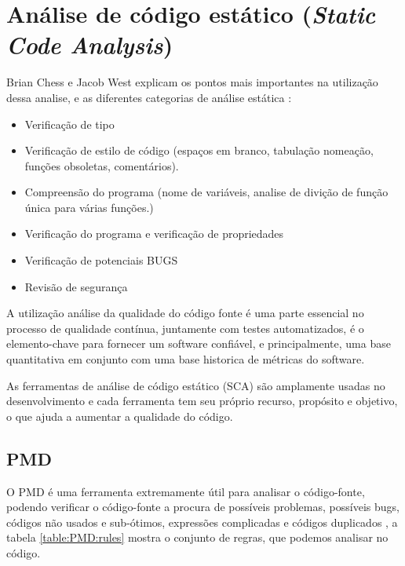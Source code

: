 \documentclass[12pt]{article}
\begin{document}
\section{Análise de código estático (\textit{Static Code Analysis})} \label{sec:staticcodeanalysis}
Brian Chess e Jacob West explicam \cite{SECURE_PROGRAMMING_STATIC_ANALYSIS} os pontos mais importantes na utilização dessa analise, e as diferentes categorias de análise estática :

\begin{itemize}
 \item Verificação de tipo
 \item Verificação de estilo de código (espaços em branco, tabulação nomeação, funções obsoletas, comentários).
 \item Compreensão do programa (nome de variáveis, analise de divição de função única para várias funções.)
 \item Verificação do programa e verificação de propriedades
 \item Verificação de potenciais BUGS
 \item Revisão de segurança
\end{itemize} 

A utilização análise da qualidade do código fonte é uma parte essencial no processo de qualidade contínua, juntamente com testes automatizados, é o elemento-chave para fornecer um software confiável, e principalmente, uma base quantitativa em conjunto com uma base historica de métricas do software. 

As ferramentas de análise de código estático (SCA) são amplamente usadas no desenvolvimento \cite{SECURE_PROGRAMMING_STATIC_ANALYSIS} e cada ferramenta tem seu próprio recurso, propósito e objetivo, o que ajuda a aumentar a qualidade do código. 

\subsection{PMD} \label{sec:pmd}
	O PMD é uma ferramenta extremamente útil para analisar o código-fonte, podendo verificar o código-fonte a procura de possíveis problemas, possíveis bugs, códigos não usados e sub-ótimos, expressões complicadas e códigos duplicados \cite{PMD}, a tabela \ref{table:PMD:rules} mostra o conjunto de regras, que podemos analisar no código.
\end{document}
